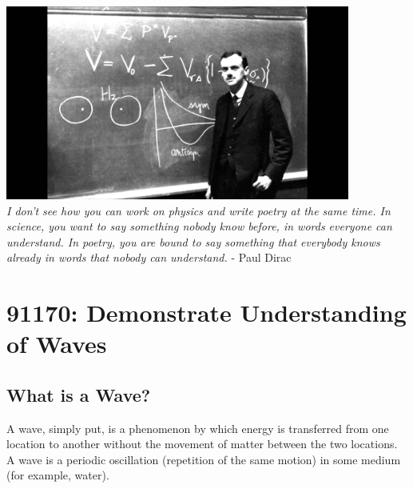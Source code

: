 \documentclass[a4paper]{amsbook}
\begin{document}
\vspace*{\fill}
\begin{center}
  \includegraphics[width=0.85\textwidth]{dirac}\\
  \textit{I don't see how you can work on physics and write poetry at the same time. In science, you want to say
  something nobody know before, in words everyone can understand. In poetry, you are bound to say something that
  everybody knows already in words that nobody can understand.} - Paul Dirac
\end{center}

\chapter{91170: Demonstrate Understanding of Waves}
\section{What is a Wave?}
A wave, simply put, is a phenomenon by which energy is transferred from one location to another
without the movement of matter between the two locations. A wave is a periodic oscillation (repetition
of the same motion) in some medium (for example, water).
\end{document}
